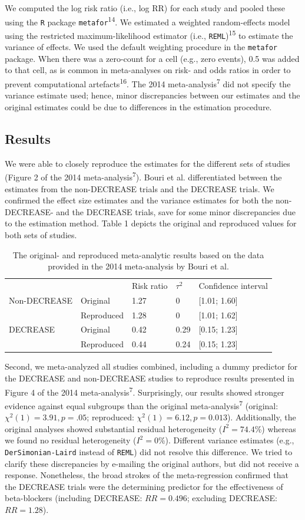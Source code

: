 \documentclass[]{article}
\begin{document}
We computed the log risk ratio (i.e., log RR) for each study and pooled
these using the \texttt{R} package \texttt{metafor}\textsuperscript{14}.
We estimated a weighted random-effects model using the restricted
maximum-likelihood estimator (i.e., \texttt{REML})\textsuperscript{15}
to estimate the variance of effects. We used the default weighting
procedure in the \texttt{metafor} package. When there was a zero-count
for a cell (e.g., zero events), 0.5 was added to that cell, as is common
in meta-analyses on risk- and odds ratios in order to prevent
computational artefacts\textsuperscript{16}. The 2014
meta-analysis\textsuperscript{7} did not specify the variance estimate
used; hence, minor discrepancies between our estimates and the original
estimates could be due to differences in the estimation procedure.

\subsection{Results}\label{results}

We were able to closely reproduce the estimates for the different sets
of studies (Figure 2 of the 2014 meta-analysis\textsuperscript{7}).
Bouri et al. differentiated between the estimates from the non-DECREASE
trials and the DECREASE trials. We confirmed the effect size estimates
and the variance estimates for both the non-DECREASE- and the DECREASE
trials, save for some minor discrepancies due to the estimation method.
Table 1 depicts the original and reproduced values for both sets of
studies.

\begin{longtable}[]{@{}lllll@{}}
\caption{The original- and reproduced meta-analytic results based on the
data provided in the 2014 meta-analysis by Bouri et al.}\tabularnewline
\toprule
& & Risk ratio & \(\tau^2\) & Confidence interval\tabularnewline
Non-DECREASE & Original & 1.27 & 0 & {[}1.01; 1.60{]}\tabularnewline
& Reproduced & 1.28 & 0 & {[}1.01; 1.62{]}\tabularnewline
DECREASE & Original & 0.42 & 0.29 & {[}0.15; 1.23{]}\tabularnewline
& Reproduced & 0.44 & 0.24 & {[}0.15; 1.23{]}\tabularnewline
\bottomrule
\end{longtable}

Second, we meta-analyzed all studies combined, including a dummy
predictor for the DECREASE and non-DECREASE studies to reproduce results
presented in Figure 4 of the 2014 meta-analysis\textsuperscript{7}.
Surprisingly, our results showed stronger evidence against equal
subgroups than the original meta-analysis\textsuperscript{7} (original:
\(\chi^2(1)=3.91,p=.05\); reproduced: \(\chi^2(1)=6.12,p=0.013\)).
Additionally, the original analyses showed substantial residual
heterogeneity (\(I^2=74.4\)\%) whereas we found no residual
heterogeneity (\(I^2=0\)\%). Different variance estimates (e.g.,
\texttt{DerSimonian-Laird} instead of \texttt{REML}) did not resolve
this difference. We tried to clarify these discrepancies by e-mailing
the original authors, but did not receive a response. Nonetheless, the
broad strokes of the meta-regression confirmed that the DECREASE trials
were the determining predictor for the effectiveness of beta-blockers
(including DECREASE: \(RR=0.496\); excluding DECREASE: \(RR=1.28\)).
\end{document}
